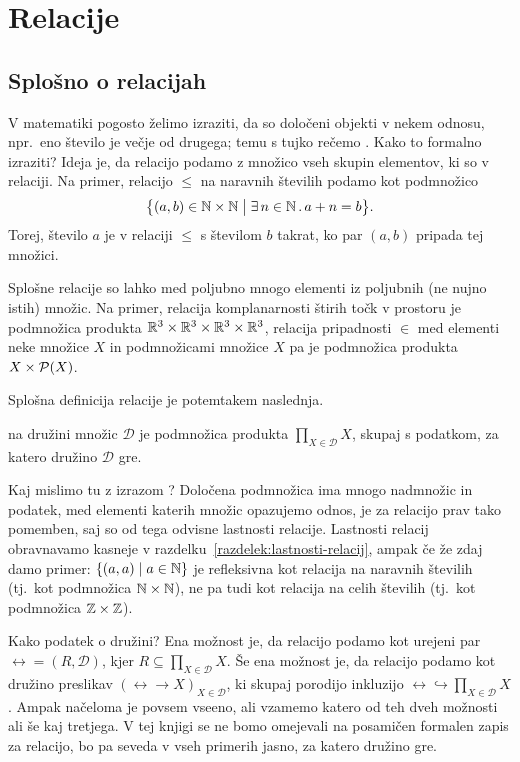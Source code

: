 \chapter{Relacije}\label{poglavje:relacije}

        \section{Splošno o relacijah}

                V matematiki pogosto želimo izraziti, da so določeni objekti v nekem odnosu, npr.~eno število je večje od drugega; temu s tujko rečemo . Kako to formalno izraziti? Ideja je, da relacijo podamo z množico vseh skupin elementov, ki so v relaciji. Na primer, relacijo $\leq$ na naravnih številih podamo kot podmnožico
                \[\set[1]{(a, b) \in \NN \times \NN}{\xsome{n}[\NN]{a + n = b}}.\]
                Torej, število $a$ je v relaciji $\leq$ s številom $b$ takrat, ko par $(a, b)$ pripada tej množici.

                Splošne relacije so lahko med poljubno mnogo elementi iz poljubnih (ne nujno istih) množic. Na primer, relacija komplanarnosti štirih točk v prostoru je podmnožica produkta $\mathbb{R}^3 \times \mathbb{R}^3 \times \mathbb{R}^3 \times \mathbb{R}^3$, relacija pripadnosti $\in$ med elementi neke množice $X$ in podmnožicami množice $X$ pa je podmnožica produkta $X \times \mathcal{P}(X)$.

                Splošna definicija relacije je potemtakem naslednja.
                \begin{definicija}
                         na družini množic $\mathscr{D}$ je podmnožica produkta $\prod_{X \in \mathscr{D}} X$, skupaj s podatkom, za katero družino $\mathscr{D}$ gre.
                \end{definicija}

                \begin{opomba}\label{opomba:definicija-relacij}
                        Kaj mislimo tu z izrazom ? Določena podmnožica ima mnogo nadmnožic in podatek, med elementi katerih množic opazujemo odnos, je za relacijo prav tako pomemben, saj so od tega odvisne lastnosti relacije. Lastnosti relacij obravnavamo kasneje v razdelku~\ref{razdelek:lastnosti-relacij}, ampak če že zdaj damo primer: $\set{(a, a)}{a \in \NN}$ je refleksivna kot relacija na naravnih številih (tj.~kot podmnožica $\mathbb{N} \times \mathbb{N}$), ne pa tudi kot relacija na celih številih (tj.~kot podmnožica $\mathbb{Z} \times \mathbb{Z}$).

                        Kako  podatek o družini? Ena možnost je, da relacijo podamo kot urejeni par $\rel = (R, \mathscr{D})$, kjer $R \subseteq \prod_{X \in \mathscr{D}} X$. Še ena možnost je, da relacijo podamo kot družino preslikav $(\rel \to X)_{X \in \mathscr{D}}$, ki skupaj porodijo inkluzijo $\rel \hookrightarrow \prod_{X \in \mathscr{D}} X$. Ampak načeloma je povsem vseeno, ali vzamemo katero od teh dveh možnosti ali še kaj tretjega. V tej knjigi se ne bomo omejevali na posamičen formalen zapis za relacijo, bo pa seveda v vseh primerih jasno, za katero družino gre.
                \end{opomba}

